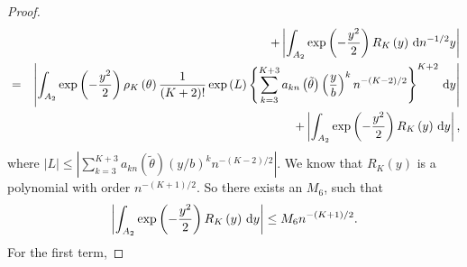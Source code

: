 \begin{proof}
\begin{eqnarray*}
 &  & +\left|\int_{A_{2}}\exp\left(-\frac{y^{2}}{2}\right)R_{K}\left(y\right)\,\mathrm{d} n^{-1/2}y\right|\\
 & = & \left|\int_{A_{2}}\exp\left(-\frac{y^{2}}{2}\right)\rho_{K}\left(\theta\right)\frac{1}{\left(K+2\right)!}\exp\left(L\right)\left\{ \sum_{k=3}^{K+3}a_{kn}\left(\tilde{\theta}\right)\left(\frac{y}{b}\right)^{k}n^{-\left(K-2\right)/2}\right\} ^{K+2}\,\mathrm{d} y\right|\\
 &  & +\left|\int_{A_{2}}\exp\left(-\frac{y^{2}}{2}\right)R_{K}\left(y\right)\,\mathrm{d} y\right|,
\end{eqnarray*}
where $\left|L\right|\le\left|\sum_{k=3}^{K+3}a_{kn}\left(\tilde{\theta}\right)\left(y/b\right)^{k}n^{-\left(K-2\right)/2}\right|$.
We know that $R_{K}\left(y\right)$ is a polynomial with order $n^{-\left(K+1\right)/2}$.
So there exists an $M_{6}$, such that 
\[
\left|\int_{A_{2}}\exp\left(-\frac{y^{2}}{2}\right)R_{K}\left(y\right)\,\mathrm{d} y\right|\le M_{6}n^{-\left(K+1\right)/2}.
\]
For the first term, 


\end{proof}
